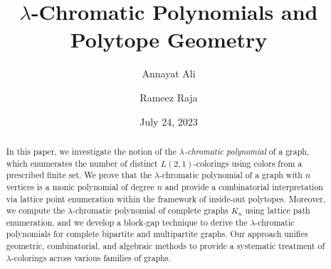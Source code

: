 \documentclass{birkjour}
\theoremstyle{definition}
\theoremstyle{remark}
\numberwithin{equation}{section}
\begin{document}
%
%
%
%
%
%
%
%
%


\title[  $\lambda$-Chromatic Polynomials and Polytope Geometry]
 { $\lambda$-Chromatic Polynomials and Polytope Geometry}



\author[A. Ali]{Annayat Ali}

\address{%
National Institute of Technology, Srinagar, \\
Jammu and Kashmir,\\
 190006, India.}


\author[R. Raja]{Rameez Raja}

\address{%
National Institute of Technology, Srinagar, \\
Jammu and Kashmir,\\
 190006, India.}




\subjclass{}

\keywords{}

 \date{July 24, 2023}

\begin{abstract}
In this paper, we investigate the notion of the \textit{$\lambda$-chromatic polynomial} of a graph, which enumerates the number of distinct $L(2,1)$-colorings using colors from a prescribed finite set. We prove that the $\lambda$-chromatic polynomial of a graph with $n$ vertices is a monic polynomial of degree $n$ and provide a combinatorial interpretation via lattice point enumeration within the framework of inside-out polytopes. Moreover, we compute the $\lambda$-chromatic polynomial of complete graphs $K_n$ using lattice path enumeration, and we develop a block-gap technique to derive the $\lambda$-chromatic polynomials for complete bipartite and multipartite graphs. Our approach unifies geometric, combinatorial, and algebraic methods to provide a systematic treatment of $\lambda$-colorings across various families of graphs.


\end{abstract}
\end{document}
